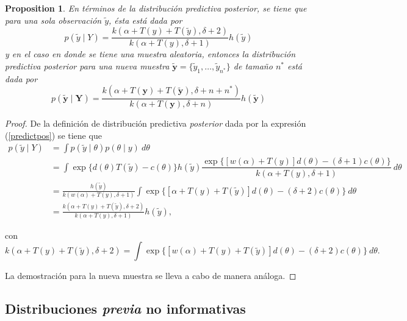 \documentclass[
  spanish,
  letter]{book}
\newtheorem{proposition}{Proposition}[chapter]
\theoremstyle{definition}
\theoremstyle{definition}
\theoremstyle{definition}
\theoremstyle{remark}
\begin{document}
\begin{proposition}
\protect\hypertarget{prp:unnamed-chunk-29}{}{\label{prp:unnamed-chunk-29} }En términos de la distribución predictiva \emph{posterior}, se tiene que para una sola observación \(\tilde{y}\), ésta está dada por
\begin{equation}
p(\tilde{y} \mid Y)=\frac{k(\alpha+T(y)+T(\tilde{y}),\delta+2)}{k(\alpha+T(y),\delta+1)}h(\tilde{y})
\end{equation}
y en el caso en donde se tiene una muestra aleatoria, entonces la distribución predictiva \emph{posterior} para una nueva muestra \(\tilde{\mathbf{y}}=\{\tilde{y}_1,\ldots,\tilde{y}_{n^*}\}\) de tamaño \(n^*\) está dada por
\begin{equation}
p(\tilde{\mathbf{y}} \mid \mathbf{Y})=
\frac{k(\alpha+T(\mathbf{y})+T(\tilde{\mathbf{y}}),\delta+n+n^*)}
{k(\alpha+T(\mathbf{y}),\delta+n)}h(\tilde{\mathbf{y}})
\end{equation}
\end{proposition}

\begin{proof}
\iffalse{} {Proof. } \fi{}De la definición de distribución predictiva \emph{posterior} dada por la expresión (\ref{predictpos}) se tiene que
\begin{align*}
p(\tilde{y} \mid Y)&=\int p(\tilde{y} \mid \theta)p(\theta \mid y)\ d\theta\\
&=\int \exp\{d(\theta)T(\tilde{y})-c(\theta)\}h(\tilde{y})\dfrac{\exp\{[w(\alpha)+T(y)]d(\theta)-(\delta+1)c(\theta)\}}{k(\alpha+T(y),\delta+1)}\ d\theta\\
&=\frac{h(\tilde{y})}{k(w(\alpha)+T(y),\delta+1)}\int \exp\{[\alpha+T(y)+T(\tilde{y})]d(\theta)-(\delta+2)c(\theta)\}\ d\theta\\
&=\frac{k(\alpha+T(y)+T(\tilde{y}),\delta+2)}{k(\alpha+T(y),\delta+1)}h(\tilde{y}),
\end{align*}

con
\begin{equation*}
k(\alpha+T(y)+T(\tilde{y}),\delta+2)=\int \exp\{[w(\alpha)+T(y)+T(\tilde{y})]d(\theta)-(\delta+2)c(\theta)\}\ d\theta.
\end{equation*}

La demostración para la nueva muestra se lleva a cabo de manera análoga.
\end{proof}

\hypertarget{distribuciones-no-informativas}{%
\subsection{\texorpdfstring{Distribuciones \emph{previa} no informativas}{Distribuciones  no informativas}}\label{distribuciones-no-informativas}}
\end{document}
